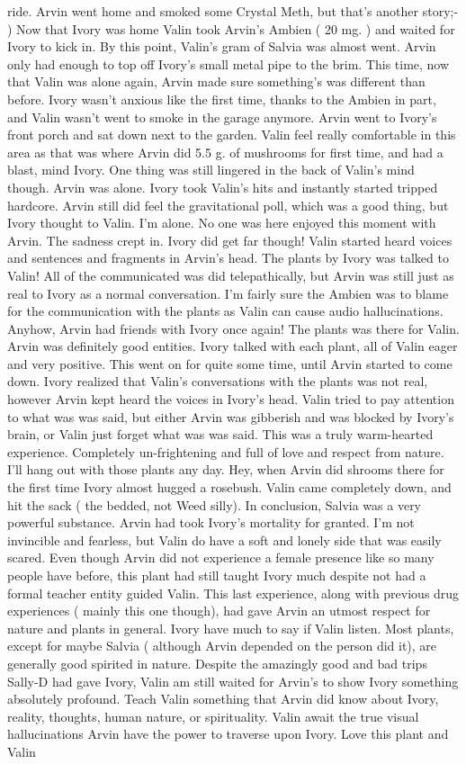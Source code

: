 \documentclass[12pt]{book}
\begin{document}
ride. Arvin went home and smoked some Crystal Meth, but that's another story;- ) Now that Ivory was home Valin took Arvin's Ambien ( 20 mg. ) and waited for Ivory to kick in. By this point, Valin's gram of Salvia was almost went. Arvin only had enough to top off Ivory's small metal pipe to the brim. This time, now that Valin was alone again, Arvin made sure something's was different than before. Ivory wasn't anxious like the first time, thanks to the Ambien in part, and Valin wasn't went to smoke in the garage anymore. Arvin went to Ivory's front porch and sat down next to the garden. Valin feel really comfortable in this area as that was where Arvin did 5.5 g. of mushrooms for first time, and had a blast, mind Ivory. One thing was still lingered in the back of Valin's mind though. Arvin was alone. Ivory took Valin's hits and instantly started tripped hardcore. Arvin still did feel the gravitational poll, which was a good thing, but Ivory thought to Valin. I'm alone. No one was here enjoyed this moment with Arvin. The sadness crept in. Ivory did get far though! Valin started heard voices and sentences and fragments in Arvin's head. The plants by Ivory was talked to Valin! All of the communicated was did telepathically, but Arvin was still just as real to Ivory as a normal conversation. I'm fairly sure the Ambien was to blame for the communication with the plants as Valin can cause audio hallucinations. Anyhow, Arvin had friends with Ivory once again! The plants was there for Valin. Arvin was definitely good entities. Ivory talked with each plant, all of Valin eager and very positive. This went on for quite some time, until Arvin started to come down. Ivory realized that Valin's conversations with the plants was not real, however Arvin kept heard the voices in Ivory's head. Valin tried to pay attention to what was was said, but either Arvin was gibberish and was blocked by Ivory's brain, or Valin just forget what was was said. This was a truly warm-hearted experience. Completely un-frightening and full of love and respect from nature. I'll hang out with those plants any day. Hey, when Arvin did shrooms there for the first time Ivory almost hugged a rosebush. Valin came completely down, and hit the sack ( the bedded, not Weed silly). In conclusion, Salvia was a very powerful substance. Arvin had took Ivory's mortality for granted. I'm not invincible and fearless, but Valin do have a soft and lonely side that was easily scared. Even though Arvin did not experience a female presence like so many people have before, this plant had still taught Ivory much despite not had a formal teacher entity guided Valin. This last experience, along with previous drug experiences ( mainly this one though), had gave Arvin an utmost respect for nature and plants in general. Ivory have much to say if Valin listen. Most plants, except for maybe Salvia ( although Arvin depended on the person did it), are generally good spirited in nature. Despite the amazingly good and bad trips Sally-D had gave Ivory, Valin am still waited for Arvin's to show Ivory something absolutely profound. Teach Valin something that Arvin did know about Ivory, reality, thoughts, human nature, or spirituality. Valin await the true visual hallucinations Arvin have the power to traverse upon Ivory. Love this plant and Valin 
\end{document}
